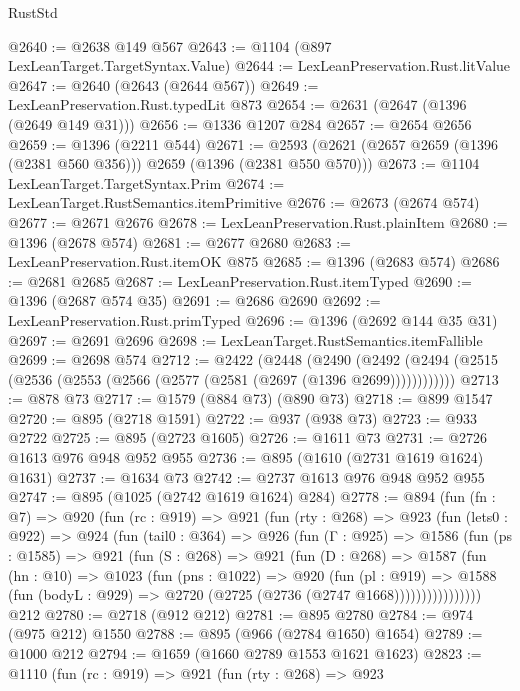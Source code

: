 \begin{lexlean}{RustStd}
\begin{coremodule}
@2640 := @2638 @149 @567
@2643 := @1104 (@897 LexLeanTarget.TargetSyntax.Value)
@2644 := LexLeanPreservation.Rust.litValue
@2647 := @2640 (@2643 (@2644 @567))
@2649 := LexLeanPreservation.Rust.typedLit @873
@2654 := @2631 (@2647 (@1396 (@2649 @149 @31)))
@2656 := @1336 @1207 @284
@2657 := @2654 @2656
@2659 := @1396 (@2211 @544)
@2671 := @2593 (@2621 (@2657 @2659 (@1396 (@2381 @560 @356))) @2659 (@1396 (@2381 @550 @570)))
@2673 := @1104 LexLeanTarget.TargetSyntax.Prim
@2674 := LexLeanTarget.RustSemantics.itemPrimitive
@2676 := @2673 (@2674 @574)
@2677 := @2671 @2676
@2678 := LexLeanPreservation.Rust.plainItem
@2680 := @1396 (@2678 @574)
@2681 := @2677 @2680
@2683 := LexLeanPreservation.Rust.itemOK @875
@2685 := @1396 (@2683 @574)
@2686 := @2681 @2685
@2687 := LexLeanPreservation.Rust.itemTyped
@2690 := @1396 (@2687 @574 @35)
@2691 := @2686 @2690
@2692 := LexLeanPreservation.Rust.primTyped
@2696 := @1396 (@2692 @144 @35 @31)
@2697 := @2691 @2696
@2698 := LexLeanTarget.RustSemantics.itemFallible
@2699 := @2698 @574
@2712 := @2422
    (@2448
      (@2490 (@2492 (@2494 (@2515 (@2536 (@2553 (@2566 (@2577 (@2581 (@2697 (@1396 @2699))))))))))))
@2713 := @878 @73
@2717 := @1579 (@884 @73) (@890 @73)
@2718 := @899 @1547
@2720 := @895 (@2718 @1591)
@2722 := @937 (@938 @73)
@2723 := @933 @2722
@2725 := @895 (@2723 @1605)
@2726 := @1611 @73
@2731 := @2726 @1613 @976 @948 @952 @955
@2736 := @895 (@1610 (@2731 @1619 @1624) @1631)
@2737 := @1634 @73
@2742 := @2737 @1613 @976 @948 @952 @955
@2747 := @895 (@1025 (@2742 @1619 @1624) @284)
@2778 := @894
    (fun (fn : @7) =>
    @920
      (fun (rc : @919) =>
      @921
        (fun (rty : @268) =>
        @923
          (fun (lets0 : @922) =>
          @924
            (fun (tail0 : @364) =>
            @926
              (fun (Γ : @925) =>
              @1586
                (fun (ps : @1585) =>
                @921
                  (fun (S : @268) =>
                  @921
                    (fun (D : @268) =>
                    @1587
                      (fun (hn : @10) =>
                      @1023
                        (fun (pns : @1022) =>
                        @920
                          (fun (pl : @919) =>
                          @1588
                            (fun (bodyL : @929) => @2720 (@2725 (@2736 (@2747 @1668))))))))))))))))
    @212
@2780 := @2718 (@912 @212)
@2781 := @895 @2780
@2784 := @974 (@975 @212) @1550
@2788 := @895 (@966 (@2784 @1650) @1654)
@2789 := @1000 @212
@2794 := @1659 (@1660 @2789 @1553 @1621 @1623)
@2823 := @1110
    (fun (rc : @919) =>
    @921
      (fun (rty : @268) =>
      @923

\end{coremodule}
\end{lexlean}
